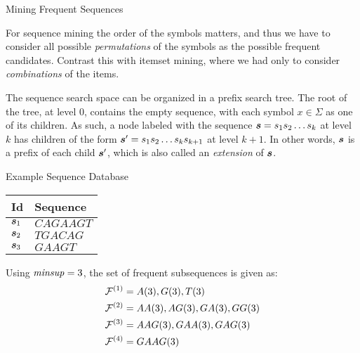 \begin{frame}{Mining Frequent Sequences}

  For sequence mining the order of the symbols matters, and thus we have
to consider all possible {\em permutations} of the symbols as the
possible frequent candidates. Contrast this with itemset mining, where
we had only to consider {\em combinations} of the items.  

The sequence
search space can be organized in a pref\/{i}x search tree.  The root of the
tree, at level 0, contains the empty sequence, with each symbol $x \in
\Sigma$ as one of its children. As such, a node labeled with the
sequence ${\boldsymbol s}=s_1s_2\ldots s_k$ at level $k$ has children of the form
${\boldsymbol s}' = s_1s_2\ldots s_ks_{k+1}$ at level $k+1$. In other words, ${\boldsymbol s}$
is a pref\/{i}x of each child ${\boldsymbol s}'$, which is also called an {\em
extension} of ${\boldsymbol s}$.

\end{frame}


\begin{frame}{Example Sequence Database}
\begin{center}
\begin{tabular}[h]{|l|l|}
    \hline
    Id & Sequence\\ \hline
    \hline
    ${\boldsymbol s}_1$ & $\mathit{CAGAAGT}$\\
    \hline
    ${\boldsymbol s}_2$ & $\mathit{TGACAG}$\\
    \hline
    ${\boldsymbol s}_3$ & $\mathit{GAAGT}$\\
    \hline
  \end{tabular}
\end{center}

\begin{block}
  
Using $\mathit{minsup}=3$, the set of frequent subsequences is given as:
\begin{align*}
  {\mathcal F}^{(1)} & = A(3), G(3), T(3)\\
  {\mathcal F}^{(2)} & = AA(3), AG(3), GA(3), GG(3)\\
  {\mathcal F}^{(3)} & = AAG(3), GAA(3), GAG(3)\\
  {\mathcal F}^{(4)} & = GAAG(3)
\end{align*}

\end{block}

\end{frame}


